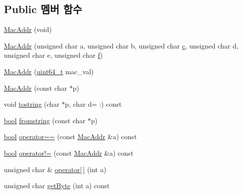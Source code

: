 \subsection*{Public 멤버 함수}
\begin{DoxyCompactItemize}
\item 
\hyperlink{classavdecc__lib_1_1utility_1_1_mac_addr_a6732281c2f241ce2700900e3df7a7f2d}{Mac\+Addr} (void)
\item 
\hyperlink{classavdecc__lib_1_1utility_1_1_mac_addr_a1a0361763a9cc3474da89ad1fd485433}{Mac\+Addr} (unsigned char a, unsigned char b, unsigned char \hyperlink{shaper__daemon_8c_a4e1e0e72dd773439e333c84dd762a9c3}{c}, unsigned char d, unsigned char e, unsigned char \hyperlink{_i_e_e_e754_plugin_test__c_8c_ac9a1bf077a6110a5f27b9bdd6030aa83}{f})
\item 
\hyperlink{classavdecc__lib_1_1utility_1_1_mac_addr_a3d65e8792ee72dcf7330e3552d3f197e}{Mac\+Addr} (\hyperlink{parse_8c_aec6fcb673ff035718c238c8c9d544c47}{uint64\+\_\+t} mac\+\_\+val)
\item 
\hyperlink{classavdecc__lib_1_1utility_1_1_mac_addr_a34772033200e5fd42cf0050272a3b949}{Mac\+Addr} (const char $\ast$p)
\item 
void \hyperlink{classavdecc__lib_1_1utility_1_1_mac_addr_a167ef5374b6a9aa8e08c427eb580ad45}{tostring} (char $\ast$p, char d= \textquotesingle{}\+:\textquotesingle{}) const 
\item 
\hyperlink{avb__gptp_8h_af6a258d8f3ee5206d682d799316314b1}{bool} \hyperlink{classavdecc__lib_1_1utility_1_1_mac_addr_a4774a14f34cf98bd40e6806d661afe63}{fromstring} (const char $\ast$p)
\item 
\hyperlink{avb__gptp_8h_af6a258d8f3ee5206d682d799316314b1}{bool} \hyperlink{classavdecc__lib_1_1utility_1_1_mac_addr_a849836135b7c70ad9fb8bd6ec15feda4}{operator==} (const \hyperlink{classavdecc__lib_1_1utility_1_1_mac_addr}{Mac\+Addr} \&a) const 
\item 
\hyperlink{avb__gptp_8h_af6a258d8f3ee5206d682d799316314b1}{bool} \hyperlink{classavdecc__lib_1_1utility_1_1_mac_addr_a311337a88dcc4fb98dfc73ed6276f3d5}{operator!=} (const \hyperlink{classavdecc__lib_1_1utility_1_1_mac_addr}{Mac\+Addr} \&a) const 
\item 
unsigned char \& \hyperlink{classavdecc__lib_1_1utility_1_1_mac_addr_ad11f67d43ee31b629c7de72957080bc0}{operator\mbox{[}$\,$\mbox{]}} (int a)
\item 
unsigned char \hyperlink{classavdecc__lib_1_1utility_1_1_mac_addr_a0ea3490a600ad3df194b38fc2d1ba264}{get\+Byte} (int a) const 
\end{DoxyCompactItemize}
